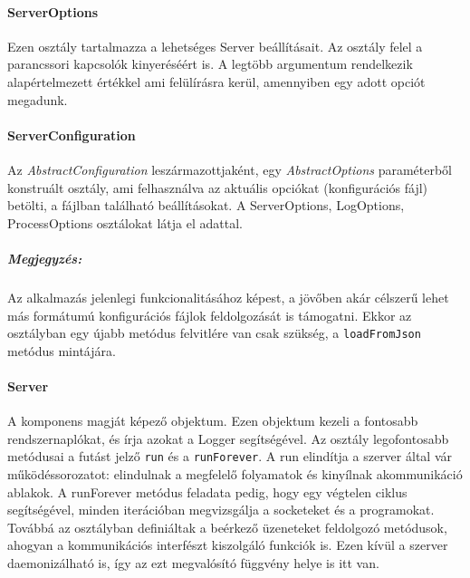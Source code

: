 \documentclass[12pt]{report}
\begin{document}
  \paragraph{ServerOptions}
  Ezen osztály tartalmazza a lehetséges Server beállításait. Az osztály felel a parancssori kapcsolók kinyeréséért is. A legtöbb argumentum rendelkezik alapértelmezett értékkel ami felülírásra kerül, amennyiben egy adott opciót megadunk.
  \paragraph{ServerConfiguration}
  Az \textit{AbstractConfiguration} leszármazottjaként, egy \textit{AbstractOptions} paraméterből konstruált osztály, ami felhasználva az aktuális opciókat (konfigurációs fájl) betölti, a fájlban található beállításokat. A ServerOptions, LogOptions, ProcessOptions osztálokat látja el adattal.
  \subparagraph{Megjegyzés:}
  Az alkalmazás jelenlegi funkcionalitásához képest, a jövőben akár célszerű lehet más formátumú konfigurációs fájlok feldolgozását is támogatni. Ekkor az osztályban egy újabb metódus felvitlére van csak szükség, a \verb|loadFromJson| metódus mintájára.
  \paragraph{Server}
  A komponens magját képező objektum. Ezen objektum kezeli a fontosabb rendszernaplókat, és írja azokat a Logger segítségével. Az osztály legofontosabb metódusai a futást jelző \verb|run| és a \verb|runForever|. A run elindítja a szerver által vár működéssorozatot:  elindulnak a megfelelő folyamatok és kinyílnak akommunikáció ablakok. A runForever metódus  feladata pedig, hogy egy végtelen ciklus segítségével, minden iterációban megvizsgálja a socketeket és a programokat. Továbbá az osztályban definiáltak a beérkező üzeneteket feldolgozó metódusok, ahogyan a kommunikációs interfészt kiszolgáló funkciók is.
  Ezen kívül a szerver daemonizálható is, így az ezt megvalósító függvény helye is itt van.
  
\end{document}
